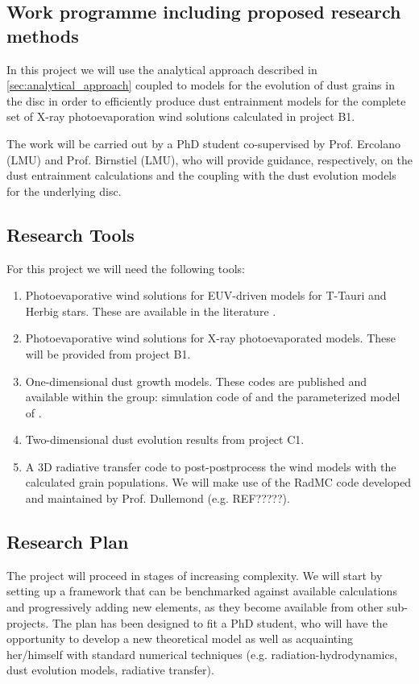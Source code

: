 \documentclass[10pt,fleqn,twoside]{article}
\newcommand{\Tcol}{\color{blue}}
\begin{document}
\subsection{\Tcol Work programme including proposed research methods}

In this project we will use the analytical approach described in
\cref{sec:analytical_approach} coupled to models for the
evolution of dust grains in the disc in order to efficiently produce
dust entrainment models for the complete set of X-ray photoevaporation
wind solutions calculated in project B1.

The work will be carried out by a PhD student co-supervised by
Prof. Ercolano (LMU) and Prof. Birnstiel (LMU), who will provide
guidance, respectively, on the dust entrainment calculations and the
coupling with the dust evolution models for the underlying disc. 

\subsection{Research Tools}

For this project we will need the following tools:
\begin{enumerate}
\item Photoevaporative wind solutions for EUV-driven
models for T-Tauri and Herbig stars. These are
available in the literature \citep[e.g.,][]{2004ApJ...607..890F}.
\item Photoevaporative wind solutions for X-ray photoevaporated
models. These will be provided from project B1.
\item One-dimensional dust growth models. These codes are published
and available within the group: simulation code of 
 \citet{2010A&A...513A..79B} and the parameterized model of
 \citet{2012A&A...539A.148B}.
\item Two-dimensional dust evolution results from project C1.
\item A 3D radiative transfer code to post-postprocess the wind
models with the calculated grain populations. We will make use  of the
RadMC code developed and maintained by Prof. Dullemond (e.g. REF?????).
\end{enumerate}

\subsection{Research Plan} 

The project will proceed in stages of increasing complexity. We will start
by setting up a framework that can be benchmarked against available
calculations and progressively adding new elements, as they become
available from other sub-projects. The plan has been designed to fit a
PhD student, who will have the opportunity to develop a new theoretical
model as well as acquainting her/himself with standard numerical
techniques (e.g. radiation-hydrodynamics, dust evolution models,
radiative transfer). 
\end{document}
